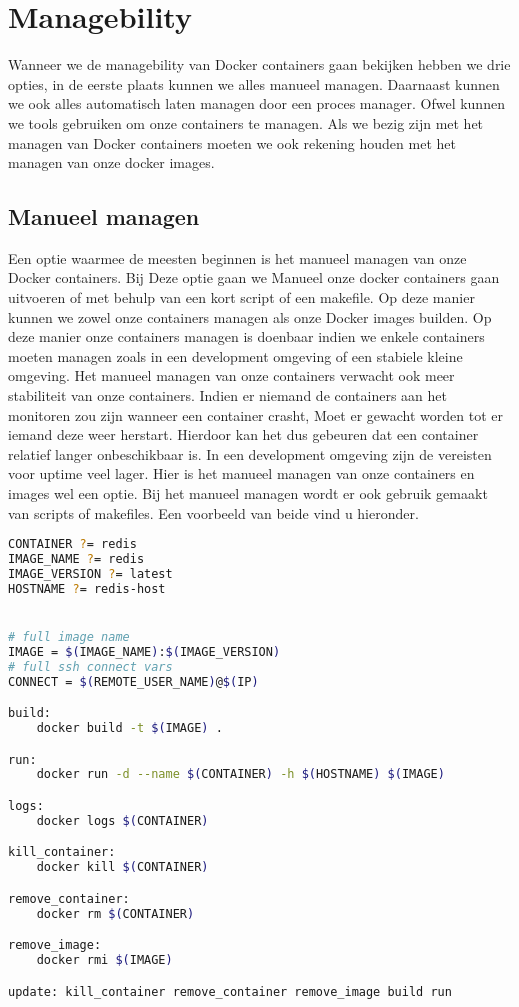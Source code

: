 \chapter{Managebility}

Wanneer we de managebility van Docker containers gaan bekijken hebben we drie opties, in de eerste plaats kunnen we alles manueel managen. Daarnaast kunnen we ook alles automatisch laten managen door een proces manager. Ofwel kunnen we tools gebruiken om onze containers te managen. Als we bezig zijn met het managen van Docker containers moeten we ook rekening houden met het managen van onze docker images. 

\section{Manueel managen}

Een optie waarmee de meesten beginnen is het manueel managen van onze Docker containers. Bij Deze optie gaan we Manueel onze docker containers gaan uitvoeren of met behulp van een kort script of een makefile. Op deze manier kunnen we zowel onze containers managen als onze Docker images builden. Op deze manier onze containers managen is doenbaar indien we enkele containers moeten managen zoals in een development omgeving of een stabiele kleine omgeving. Het manueel managen van onze containers verwacht ook meer stabiliteit van onze containers. Indien er niemand de containers aan het monitoren zou zijn wanneer een container crasht, Moet er gewacht worden tot er iemand deze weer herstart. Hierdoor kan het dus gebeuren dat een container relatief langer onbeschikbaar is. In een development omgeving zijn de vereisten voor uptime veel lager. Hier is het manueel managen van onze containers en images wel een optie. Bij het manueel managen wordt er ook gebruik gemaakt van scripts of makefiles. Een voorbeeld van beide vind u hieronder.

\begin{lstlisting}[language=bash, style=configstyle]
CONTAINER ?= redis
IMAGE_NAME ?= redis
IMAGE_VERSION ?= latest
HOSTNAME ?= redis-host


# full image name
IMAGE = $(IMAGE_NAME):$(IMAGE_VERSION)
# full ssh connect vars
CONNECT = $(REMOTE_USER_NAME)@$(IP)

build:
	docker build -t $(IMAGE) .

run:
	docker run -d --name $(CONTAINER) -h $(HOSTNAME) $(IMAGE)

logs:
	docker logs $(CONTAINER)

kill_container:
	docker kill $(CONTAINER)

remove_container:
	docker rm $(CONTAINER)

remove_image:
	docker rmi $(IMAGE)

update: kill_container remove_container remove_image build run
\end{lstlisting}

